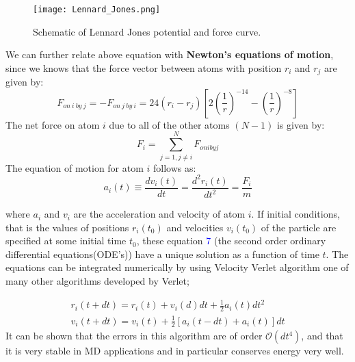 \documentclass[a4paper]{article}
\begin{document}
\begin{figure}[!htbp]
\centering
\texttt{[image: Lennard\_Jones.png]}
\caption{\label{fig:Lj}Schematic of Lennard Jones potential and force curve.}
\end{figure}

We can further relate above equation with \textbf{Newton's equations of motion}, since we knows that the force vector between atoms with position $r_i$ and $r_j$ are given by:
\begin{equation}
F_{on\: i\: by\: j} = -F_{on\: j\: by\: i} = 24(r_i - r_j)\left[2\left(\frac{1}{r}\right)^{-14} - \left(\frac{1}{r}\right)^{-8} \right]
\end{equation}
The net force on atom $i$ due to all of the other atoms $(N-1)$ is given by:
\begin{equation}
F_i = \sum_{j=1,j\neq i}^{N} F_{on i by j}
\end{equation}
The equation of motion for atom $i$ follows as:
\begin{equation}
a_i(t) \equiv \frac{dv_i(t)}{dt} = \frac{d^2r_i(t)}{dt^2} = \frac{F_i}{m}
\end{equation}

where $a_i$ and $v_i$ are the acceleration and velocity of atom $i$. If initial conditions, that is the values of positions $r_i(t_0)$ and velocities $v_i(t_0)$ of the particle are specified at some initial time $t_0$, these equation \textcolor{blue}{7} (the second order ordinary differential equations(ODE's)) have a unique solution as a function of time $t$. The equations can be integrated numerically by using Velocity Verlet algorithm one of many other algorithms developed by Verlet;

\begin{align*}
r_i(t+dt) = r_i(t) + v_i(d)dt + \frac{1}{2}a_i(t)dt^2 \\
v_i(t+dt) = v_i(t) + \frac{1}{2}[a_i(t-dt)+a_i(t)]dt
\end{align*}
It can be shown that the errors in this algorithm are of order $\mathcal{O}(dt^4)$, and that it is very stable in MD applications and in particular conserves energy very well. 
\end{document}
